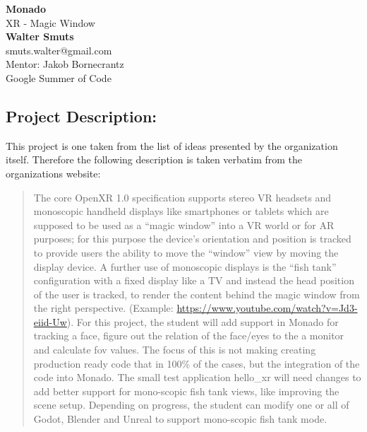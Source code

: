 \documentclass{article}
\begin{document}
\begin{center}

\LARGE{\textbf{Monado}} \\
\vspace{1em}
\Large{XR - Magic Window} \\
\vspace{1em}
\normalsize\textbf{Walter Smuts} \\
\normalsize{smuts.walter@gmail.com} \\
\vspace{1em}
\normalsize{Mentor: Jakob Bornecrantz} \\
\vspace{1em}
\normalsize{Google Summer of Code} \\

\end{center}
\begin{normalsize}

\section{Project Description:}

This project is one taken from the list of ideas presented by the organization
itself. Therefore the following description is taken verbatim from the
organizations website:

\begin{quote}

The core OpenXR 1.0 specification supports stereo VR headsets and monoscopic
handheld displays like smartphones or tablets which are supposed to be used as a
“magic window” into a VR world or for AR purposes; for this purpose the device’s
orientation and position is tracked to provide users the ability to move the
“window” view by moving the display device. A further use of monoscopic displays
is the “fish tank” configuration with a fixed display like a TV and instead the
head position of the user is tracked, to render the content behind the magic
window from the right perspective. (Example:
\url{https://www.youtube.com/watch?v=Jd3-eiid-Uw}). For this project, the student
will add support in Monado for tracking a face, figure out the relation of the
face/eyes to the a monitor and calculate fov values. The focus of this is not
making creating production ready code that in 100\% of the cases, but the
integration of the code into Monado. The small test application hello\_xr will
need changes to add better support for mono-scopic fish tank views, like improving
the scene setup. Depending on progress, the student can modify one or all of
Godot, Blender and Unreal to support mono-scopic fish tank mode.


\end{quote}
\end{normalsize}
\end{document}
